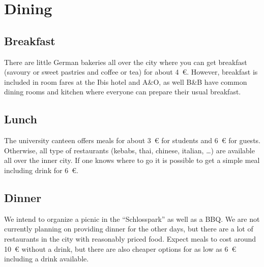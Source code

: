 \section{Dining}

\subsection{Breakfast}
There are little German bakeries all over the city where you can get breakfast (savoury or sweet pastries and coffee or tea) for about \SI{4}{\euro}. However, breakfast is included in room fares at the Ibis hotel and A\&O, as well B\&B have common dining rooms and kitchen where everyone can prepare their usual breakfast.
 
\subsection{Lunch}
The university canteen offers meals for about \SI{3}{\euro} for students and \SI{6}{\euro} for guests. Otherwise, all type of restaurants (kebabs, thai, chinese, italian, …) are available all over the inner city. If one knows where to go it is possible to get a simple meal including drink for \SI{6}{\euro}.


\subsection{Dinner}

We intend to organize a picnic in the “Schlosspark” as well as a BBQ. We are not
currently planning on providing dinner for the other days, but there are a lot
of restaurants in the city with reasonably priced food. Expect meals to cost
around \SI{10}{\euro} without a drink, but there are also cheaper options for
as low as \SI{6}{\euro} including a drink available.


